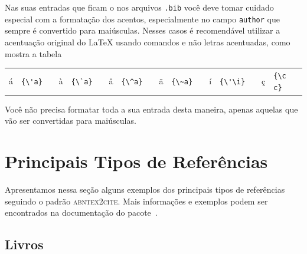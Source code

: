 \documentclass[fleqn]{profmat-cefet}
\begin{document}
Nas suas entradas que ficam o nos arquivos \texttt{.bib} 
você deve tomar cuidado especial com a formatação dos acentos, 
especialmente no campo \texttt{author} que sempre é convertido para maiúsculas. 
Nesses casos é recomendável utilizar a acentuação original do \LaTeX 
usando comandos e não letras acentuadas, como mostra a tabela
\begin{center}
    \begin{tabular}{clcclcclcclcclccl}
            á & \lstinline!{\'a}!  & & 
            à & \lstinline!{\`a}!  & & 
            â & \lstinline!{\^a}!  & & 
            ã & \lstinline!{\~a}!  & & 
            í & \lstinline!{\'\i}! & & 
            ç & \lstinline!{\c c}!
    \end{tabular}
\end{center}
Você não precisa formatar toda a sua entrada desta maneira, 
apenas aquelas que vão ser convertidas para maiúsculas.

\section{Principais Tipos de Referências}
\label{sec:principais_tipos_de_referencias}

\newcommand{\citeexample}[1]{
  \begin{flushleft}
    \vspace{-\baselineskip}Entrada produzida na bibliografia
  \end{flushleft}
  \begin{center}
    \begin{small}
    \begin{spacing}{1}
      \fbox{\parbox{0.88\linewidth}{
      \hypersetup{citecolor=black}
      \citetext{#1}
      \hypersetup{citecolor=green}
      \vspace{0.2\baselineskip}}}
    \end{spacing}
    \end{small}
  \end{center}
}

Apresentamos nessa seção alguns exemplos dos principais tipos de referências 
seguindo o padrão \textsc{abntex2cite}. Mais informações e exemplos podem 
ser encontrados na documentação do pacote~\cite{ARAUJO:ABNTEX2CITE}.

\subsection{Livros}
\end{document}
